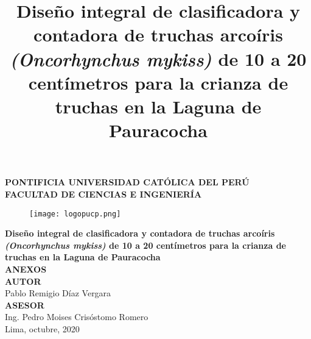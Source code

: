 \clearpage{\pagestyle{empty}\cleardoublepage}
\begin{titlepage}
\begin{center}
 {\Large \bf PONTIFICIA UNIVERSIDAD CATÓLICA DEL PERÚ}\\
  \vspace{0.8 cm} 
  {\Large \bf FACULTAD DE CIENCIAS E INGENIERÍA}\\
  \vspace{1.75 cm}
 \begin{figure}[H]
    \centering
    \texttt{[image: logopucp.png]}
\end{figure}
  \vspace{0.25cm}

\title{Diseño integral de clasificadora y contadora de truchas arcoíris \textit{(Oncorhynchus mykiss)} de 10 a 20 centímetros para la crianza de truchas en la Laguna de Pauracocha} %
{\Large \bf Diseño integral de clasificadora y contadora de truchas arcoíris \textit{(Oncorhynchus mykiss)} de 10 a 20 centímetros para la crianza de truchas en la Laguna de Pauracocha}\\ %
\vspace{0.5cm}
{\Large \bf ANEXOS}\\[2.0 cm]
{\large \bf AUTOR}\\[0.5cm]
{\large Pablo Remigio Díaz Vergara}\\[1.5 cm] %
{\large \bf ASESOR}\\[0.5 cm] 
{\large Ing. Pedro Moises Crisóstomo Romero}\\[0.5 cm] %
\vspace{1.5 cm}
{\large Lima, octubre, 2020}

\end{center}
\end{titlepage}